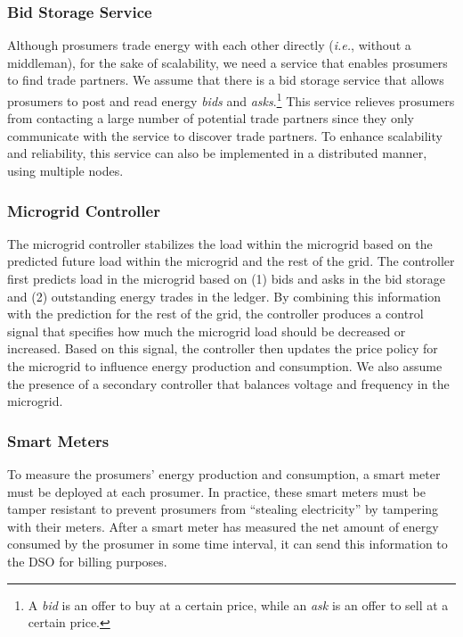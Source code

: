 \subsubsection{Bid Storage Service}
Although prosumers trade energy with each other directly (\emph{i.e.},
without a middleman), for the sake of scalability, we need a service
that enables prosumers to find trade partners.
We assume that there is a bid storage service that allows prosumers to
post and read energy \emph{bids} and \emph{asks}.\footnote{A
  \emph{bid} is an offer to buy at a certain price, while an
  \emph{ask} is an offer to sell at a certain price.}  This service
relieves prosumers from contacting a large number of potential trade
partners since they only communicate with the service to discover
trade partners.
To enhance scalability and reliability, this service can also be
implemented in a distributed manner, using multiple nodes.

\subsubsection{Microgrid Controller}
The microgrid controller stabilizes the load within the microgrid
based on the predicted future load within the microgrid and the rest
of the grid.  The controller first predicts load in the microgrid
based on (1) bids and asks in the bid storage and (2) outstanding
energy trades in the ledger.  By combining this information with the
prediction for the rest of the grid, the controller produces a control
signal that specifies how much the microgrid load should be decreased
or increased.  Based on this signal, the controller then updates the
price policy for the microgrid to influence energy production and
consumption.  We also assume the presence of a secondary controller
that balances voltage and frequency in the microgrid.

\subsubsection{Smart Meters}
To measure the prosumers' energy production and consumption, a smart
meter must be deployed at each prosumer.  In practice, these smart
meters must be tamper resistant to prevent prosumers from ``stealing
electricity'' by tampering with their meters.  After a smart meter has
measured the net amount of energy consumed by the prosumer in some
time interval, it can send this information to the DSO for billing
purposes.


